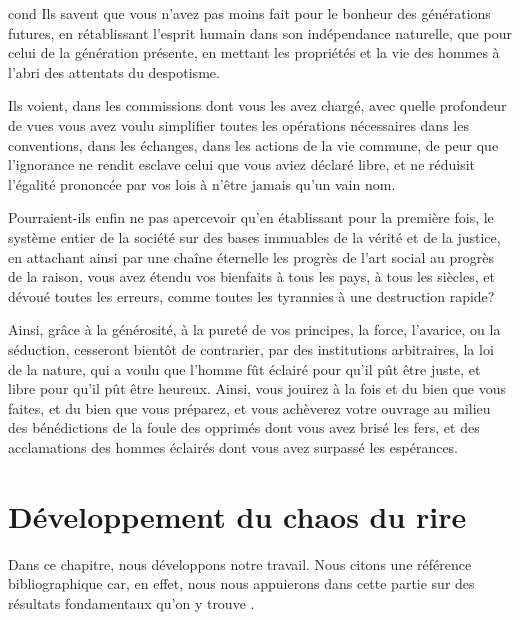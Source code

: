 \documentclass[12pt,version=final,space=onehalf,localtocs,localbibs]{yathesis}
\begin{document}
\begin{displaycquote}[509-511]{cond}
  Ils savent que vous n'avez pas moins fait pour le bonheur des
  générations futures, en rétablissant l'esprit humain dans son
  indépendance naturelle, que pour celui de la génération présente, en
  mettant les propriétés et la vie des hommes à l'abri des attentats
  du despotisme.

  Ils voient, dans les commissions dont vous les avez chargé, avec
  quelle profondeur de vues vous avez voulu simplifier toutes les
  opérations nécessaires dans les conventions, dans les échanges, dans
  les actions de la vie commune, de peur que l'ignorance ne rendit
  esclave celui que vous aviez déclaré libre, et ne réduisit l'égalité
  prononcée par vos lois à n'être jamais qu'un vain nom.

  Pourraient-ils enfin ne pas apercevoir qu'en établissant pour la
  première fois, le système entier de la société sur des bases
  immuables de la vérité et de la justice, en attachant ainsi par une
  chaîne éternelle les progrès de l'art social au progrès de la
  raison, vous avez étendu vos bienfaits à tous les pays, à tous les
  siècles, et dévoué toutes les erreurs, comme toutes les tyrannies à
  une destruction rapide?

  Ainsi, grâce à la générosité, à la pureté de vos principes, la
  force, l'avarice, ou la séduction, cesseront bientôt de contrarier,
  par des institutions arbitraires, la loi de la nature, qui a voulu
  que l'homme fût éclairé pour qu'il pût être juste, et libre pour
  qu'il pût être heureux. Ainsi, vous jouirez à la fois et du bien que
  vous faites, et du bien que vous préparez, et vous achèverez votre
  ouvrage au milieu des bénédictions de la foule des opprimés dont
  vous avez brisé les fers, et des acclamations des hommes éclairés
  dont vous avez surpassé les espérances.
\end{displaycquote}
%
\chapter{Développement du chaos du rire}
\label{chap-developpement}


Dans ce chapitre, nous développons notre travail. Nous citons une
référence
bibliographique \autocite{relativite}
car, en effet, nous nous appuierons dans cette partie sur des
résultats fondamentaux qu'on y trouve
\autocite[chap.~3]{relativite}.
\end{document}
